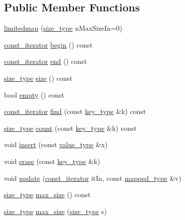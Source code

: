 \subsection*{Public Member Functions}
\begin{DoxyCompactItemize}
\item 
\mbox{\hyperlink{classlimitedmap_a6670d7a262af3551de75658123b7cb60}{limitedmap}} (\mbox{\hyperlink{classlimitedmap_a1c564b323f94e182e56aa27975e5f9d1}{size\+\_\+type}} n\+Max\+Size\+In=0)
\item 
\mbox{\hyperlink{classlimitedmap_ab0a3e4f2ec7c82359300c83a35ae2500}{const\+\_\+iterator}} \mbox{\hyperlink{classlimitedmap_a00fae18eb84547065de8beeaa3ca8fe1}{begin}} () const
\item 
\mbox{\hyperlink{classlimitedmap_ab0a3e4f2ec7c82359300c83a35ae2500}{const\+\_\+iterator}} \mbox{\hyperlink{classlimitedmap_a5d4fe21081932bc9bd8268c849a00540}{end}} () const
\item 
\mbox{\hyperlink{classlimitedmap_a1c564b323f94e182e56aa27975e5f9d1}{size\+\_\+type}} \mbox{\hyperlink{classlimitedmap_a11cfe0c541b69e34ec6b98239d3c9971}{size}} () const
\item 
bool \mbox{\hyperlink{classlimitedmap_ac93bddc5df19889386fb4094ad117ca6}{empty}} () const
\item 
\mbox{\hyperlink{classlimitedmap_ab0a3e4f2ec7c82359300c83a35ae2500}{const\+\_\+iterator}} \mbox{\hyperlink{classlimitedmap_acc9d08f77369c57ef2ce22788b146a8e}{find}} (const \mbox{\hyperlink{classlimitedmap_aebf71255c65df699225cdcefe88717b9}{key\+\_\+type}} \&k) const
\item 
\mbox{\hyperlink{classlimitedmap_a1c564b323f94e182e56aa27975e5f9d1}{size\+\_\+type}} \mbox{\hyperlink{classlimitedmap_adc3168f5a48a8b5e13a1c45decb70834}{count}} (const \mbox{\hyperlink{classlimitedmap_aebf71255c65df699225cdcefe88717b9}{key\+\_\+type}} \&k) const
\item 
void \mbox{\hyperlink{classlimitedmap_af68570a54d74e1b168908be6e8cfb85c}{insert}} (const \mbox{\hyperlink{classlimitedmap_a8a6c4972e628b71bf43eeb757dafdce5}{value\+\_\+type}} \&x)
\item 
void \mbox{\hyperlink{classlimitedmap_aaf2fa41d8f7591d93e5010cf8c351de6}{erase}} (const \mbox{\hyperlink{classlimitedmap_aebf71255c65df699225cdcefe88717b9}{key\+\_\+type}} \&k)
\item 
void \mbox{\hyperlink{classlimitedmap_af29154e7161f1deeea268d0dcea464ab}{update}} (\mbox{\hyperlink{classlimitedmap_ab0a3e4f2ec7c82359300c83a35ae2500}{const\+\_\+iterator}} it\+In, const \mbox{\hyperlink{classlimitedmap_a8bd6b8e7f91f0a141c91c382b492c03c}{mapped\+\_\+type}} \&v)
\item 
\mbox{\hyperlink{classlimitedmap_a1c564b323f94e182e56aa27975e5f9d1}{size\+\_\+type}} \mbox{\hyperlink{classlimitedmap_a3b977a4a010f6c4513ee064835ecbf36}{max\+\_\+size}} () const
\item 
\mbox{\hyperlink{classlimitedmap_a1c564b323f94e182e56aa27975e5f9d1}{size\+\_\+type}} \mbox{\hyperlink{classlimitedmap_a97e3deba25cf9a59658cfc317507d45d}{max\+\_\+size}} (\mbox{\hyperlink{classlimitedmap_a1c564b323f94e182e56aa27975e5f9d1}{size\+\_\+type}} s)
\end{DoxyCompactItemize}
